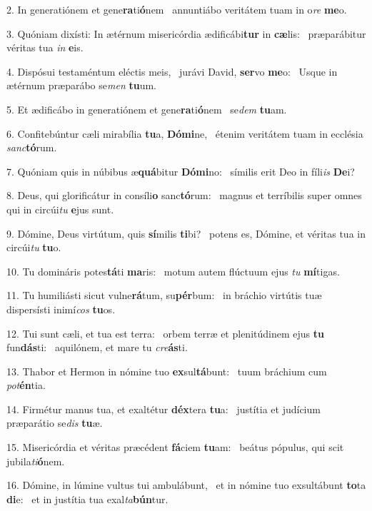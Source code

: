 2. In generatiónem et gene\textbf{ra}ti\textbf{ó}nem \ast\  annuntiábo veritátem tuam in o\textit{re} \textbf{me}o.\

3. Quóniam dixísti: In ætérnum misericórdia ædificábi\textbf{tur} in \textbf{cæ}lis: \ast\  præparábitur véritas tua \textit{in} \textbf{e}is.\

4. Dispósui testaméntum eléctis meis, \dag\  jurávi David, \textbf{ser}vo \textbf{me}o: \ast\  Usque in ætérnum præparábo se\textit{men} \textbf{tu}um.\

5. Et ædificábo in generatiónem et gene\textbf{ra}ti\textbf{ó}nem \ast\  se\textit{dem} \textbf{tu}am.\

6. Confitebúntur cæli mirabília \textbf{tu}a, \textbf{Dó}\textbf{mi}ne, \ast\  étenim veritátem tuam in ecclésia \textit{sanc}\textbf{tó}rum.\

7. Quóniam quis in núbibus æ\textbf{quá}bitur \textbf{Dó}\textbf{mi}no: \ast\  símilis erit Deo in fíli\textit{is} \textbf{De}i?\

8. Deus, qui glorificátur in consíli\textbf{o} sanc\textbf{tó}rum: \ast\  magnus et terríbilis super omnes qui in circúi\textit{tu} \textbf{e}jus sunt.\

9. Dómine, Deus virtútum, quis \textbf{sí}milis \textbf{ti}bi? \ast\  potens es, Dómine, et véritas tua in circúi\textit{tu} \textbf{tu}o.\

10. Tu domináris potes\textbf{tá}ti \textbf{ma}ris: \ast\  motum autem flúctuum ejus \textit{tu} \textbf{mí}tigas.\

11. Tu humiliásti sicut vulne\textbf{rá}tum, su\textbf{pér}bum: \ast\  in bráchio virtútis tuæ dispersísti inimí\textit{cos} \textbf{tu}os.\

12. Tui sunt cæli, et tua est terra: \dag\  orbem terræ et plenitúdinem ejus \textbf{tu} fun\textbf{dás}ti: \ast\  aquilónem, et mare tu \textit{cre}\textbf{ás}ti.\

13. Thabor et Hermon in nómine tuo \textbf{ex}sul\textbf{tá}bunt: \ast\  tuum bráchium cum \textit{pot}\textbf{én}tia.\

14. Firmétur manus tua, et exaltétur \textbf{déx}tera \textbf{tu}a: \ast\  justítia et judícium præparátio se\textit{dis} \textbf{tu}æ.\

15. Misericórdia et véritas præcédent \textbf{fá}ciem \textbf{tu}am: \ast\  beátus pópulus, qui scit jubila\textit{ti}\textbf{ó}nem.\

16. Dómine, in lúmine vultus tui ambulábunt, \dag\  et in nómine tuo exsultábunt \textbf{to}ta \textbf{di}e: \ast\  et in justítia tua exal\textit{ta}\textbf{bún}tur.\

